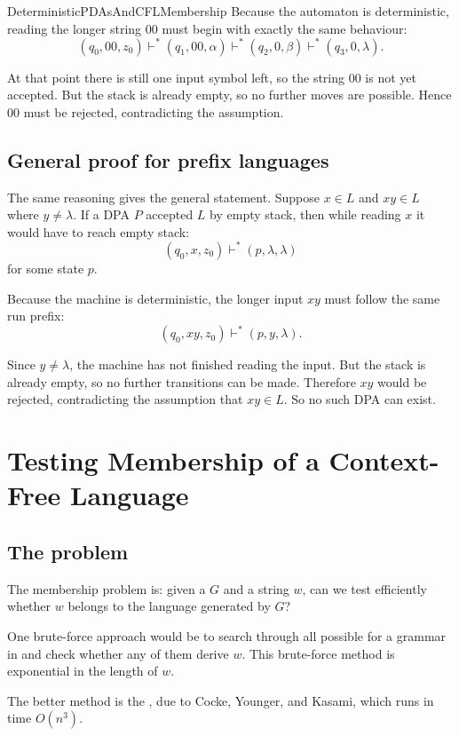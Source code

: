 \documentclass[hidelinks]{article}
\begin{document}
\begin{smodule}[title={Deterministic PDAs and CFL Membership}]{DeterministicPDAsAndCFLMembership}
Because the automaton is deterministic, reading the longer string $00$ must begin with exactly the same behaviour:
\[
(q_0,00,z_0) \vdash^* (q_1,00,\alpha) \vdash^* (q_2,0,\beta) \vdash^* (q_3,0,\lambda).
\]

At that point there is still one input symbol left, so the string $00$ is not yet accepted.
But the stack is already empty, so no further moves are possible.
Hence $00$ must be rejected, contradicting the assumption.

\subsection{General proof for prefix languages}

The same reasoning gives the general statement.
Suppose $x \in L$ and $xy \in L$ where $y \neq \lambda$.
If a DPA $P$ accepted $L$ by empty stack, then while reading $x$ it would have to reach empty stack:
\[
(q_0,x,z_0) \vdash^* (p,\lambda,\lambda)
\]
for some state $p$.

Because the machine is deterministic, the longer input $xy$ must follow the same run prefix:
\[
(q_0,xy,z_0) \vdash^* (p,y,\lambda).
\]

Since $y \neq \lambda$, the machine has not finished reading the input.
But the stack is already empty, so no further transitions can be made.
Therefore $xy$ would be rejected, contradicting the assumption that $xy \in L$.
So no such DPA can exist.

\section{Testing Membership of a Context-Free Language}

\subsection{The problem}

The membership problem is:
given a  $G$ and a string $w$, can we test efficiently whether $w$ belongs to the language generated by $G$?

One brute-force approach would be to search through all possible  for a grammar in  and check whether any of them derive $w$.
This brute-force method is exponential in the length of $w$.

The better method is the , due to Cocke, Younger, and Kasami, which runs in time $O(n^3)$.


\end{smodule}
\end{document}
